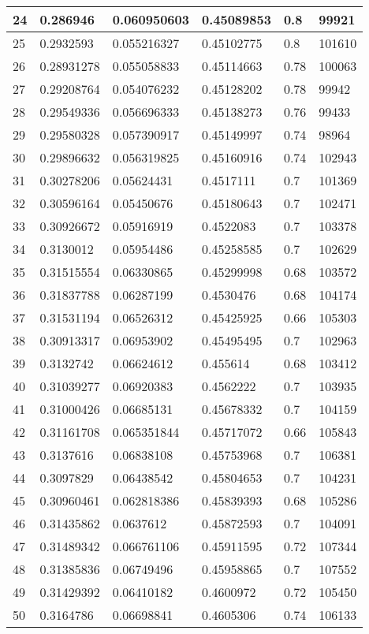 \begin{longtable}{|l|l|l|l|l|l|}
24 & 0.286946 & 0.060950603 & 0.45089853 & 0.8 & 99921 \\ \hline 
25 & 0.2932593 & 0.055216327 & 0.45102775 & 0.8 & 101610 \\ \hline 
26 & 0.28931278 & 0.055058833 & 0.45114663 & 0.78 & 100063 \\ \hline 
27 & 0.29208764 & 0.054076232 & 0.45128202 & 0.78 & 99942 \\ \hline 
28 & 0.29549336 & 0.056696333 & 0.45138273 & 0.76 & 99433 \\ \hline 
29 & 0.29580328 & 0.057390917 & 0.45149997 & 0.74 & 98964 \\ \hline 
30 & 0.29896632 & 0.056319825 & 0.45160916 & 0.74 & 102943 \\ \hline 
31 & 0.30278206 & 0.05624431 & 0.4517111 & 0.7 & 101369 \\ \hline 
32 & 0.30596164 & 0.05450676 & 0.45180643 & 0.7 & 102471 \\ \hline 
33 & 0.30926672 & 0.05916919 & 0.4522083 & 0.7 & 103378 \\ \hline 
34 & 0.3130012 & 0.05954486 & 0.45258585 & 0.7 & 102629 \\ \hline 
35 & 0.31515554 & 0.06330865 & 0.45299998 & 0.68 & 103572 \\ \hline 
36 & 0.31837788 & 0.06287199 & 0.4530476 & 0.68 & 104174 \\ \hline 
37 & 0.31531194 & 0.06526312 & 0.45425925 & 0.66 & 105303 \\ \hline 
38 & 0.30913317 & 0.06953902 & 0.45495495 & 0.7 & 102963 \\ \hline 
39 & 0.3132742 & 0.06624612 & 0.455614 & 0.68 & 103412 \\ \hline 
40 & 0.31039277 & 0.06920383 & 0.4562222 & 0.7 & 103935 \\ \hline 
41 & 0.31000426 & 0.06685131 & 0.45678332 & 0.7 & 104159 \\ \hline 
42 & 0.31161708 & 0.065351844 & 0.45717072 & 0.66 & 105843 \\ \hline 
43 & 0.3137616 & 0.06838108 & 0.45753968 & 0.7 & 106381 \\ \hline 
44 & 0.3097829 & 0.06438542 & 0.45804653 & 0.7 & 104231 \\ \hline 
45 & 0.30960461 & 0.062818386 & 0.45839393 & 0.68 & 105286 \\ \hline 
46 & 0.31435862 & 0.0637612 & 0.45872593 & 0.7 & 104091 \\ \hline 
47 & 0.31489342 & 0.066761106 & 0.45911595 & 0.72 & 107344 \\ \hline 
48 & 0.31385836 & 0.06749496 & 0.45958865 & 0.7 & 107552 \\ \hline 
49 & 0.31429392 & 0.06410182 & 0.4600972 & 0.72 & 105450 \\ \hline 
50 & 0.3164786 & 0.06698841 & 0.4605306 & 0.74 & 106133 \\ \hline 
\end{longtable}